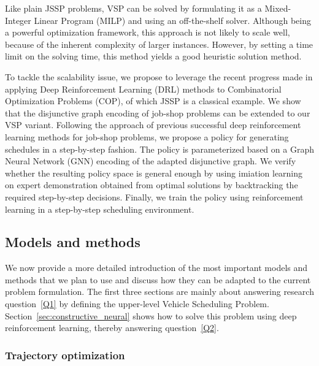 \documentclass{article}
\theoremstyle{definition}
\theoremstyle{plain}
\begin{document}
Like plain JSSP problems, VSP can be solved by formulating it as a Mixed-Integer
Linear Program (MILP) and using an off-the-shelf solver. Although being a
powerful optimization framework, this approach is not likely to scale well,
because of the inherent complexity of larger instances. However, by setting a
time limit on the solving time, this method yields a good heuristic solution
method.

To tackle the scalability issue, we propose to leverage the recent progress made
in applying Deep Reinforcement Learning (DRL) methods to Combinatorial
Optimization Problems (COP), of which JSSP is a classical example. We show that
the disjunctive graph encoding of job-shop problems can be extended to our VSP
variant. Following the approach of previous successful deep reinforcement
learning methods for job-shop problems, we propose a policy for generating
schedules in a step-by-step fashion. The policy is parameterized based on a
Graph Neural Network (GNN) encoding of the adapted disjunctive graph. We verify
whether the resulting policy space is general enough by using imiation learning
on expert demonstration obtained from optimal solutions by backtracking the
required step-by-step decisions. Finally, we train the policy using
reinforcement learning in a step-by-step scheduling environment.


\subsection{Models and methods}

We now provide a more detailed introduction of the most important models and
methods that we plan to use and discuss how they can be adapted to the current
problem formulation. The first three sections are mainly about answering
research question~\ref{Q1} by defining the upper-level Vehicle Scheduling
Problem. Section~\ref{sec:constructive_neural} shows how to solve this problem
using deep reinforcement learning, thereby answering question~\ref{Q2}.

\subsubsection{Trajectory optimization}
\end{document}

